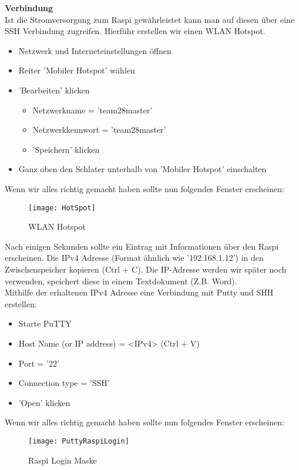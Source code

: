 \documentclass[../../main.tex]{subfiles}
\begin{document}
\textbf{Verbindung}\\
Ist die Stromversorgung zum Raspi gewährleistet kann man auf diesen über eine SSH Verbindung zugreifen. Hierführ erstellen wir einen WLAN Hotspot.
\begin{itemize}
    \item Netzwerk und Interneteinstellungen öffnen
    \item Reiter 'Mobiler Hotspot' wählen
    \item 'Bearbeiten' klicken
    \begin{itemize}
        \item Netzwerkname = 'team28master'
        \item Netzwerkkennwort = 'team28master'
        \item 'Speichern' klicken
    \end{itemize}
    \item Ganz oben den Schlater unterhalb von 'Mobiler Hotspot' einschalten
\end{itemize}

Wenn wir alles richtig gemacht haben sollte nun folgendes Fenster erscheinen:
\begin{figure}[H] \centering
    \texttt{[image: HotSpot]}
    \caption{WLAN Hotspot}
    \label{fig:HotSpot}
\end{figure}

Nach einigen Sekunden sollte ein Eintrag mit Informationen über den Raspi erscheinen.
Die IPv4 Adresse (Format ähnlich wie '192.168.1.12') in den Zwischenspeicher kopieren (Ctrl + C). Die IP-Adresse werden wir später noch verwenden, speichert diese in einem Textdokument (Z.B. Word). \\

Mithilfe der erhaltenen IPv4 Adresse eine Verbindung mit Putty und SHH erstellen:

\begin{itemize}
    \item Starte PuTTY
    \item Host Name (or IP address) = <IPv4> (Ctrl + V)
    \item Port = '22'
    \item Connection type = 'SSH'
    \item 'Open' klicken
\end{itemize}

Wenn wir alles richtig gemacht haben sollte nun folgendes Fenster erscheinen:
\begin{figure}[H] \centering
    \texttt{[image: PuttyRaspiLogin]}
    \caption{Raspi Login Maske}
    \label{fig:Login}
\end{figure}
\end{document}
